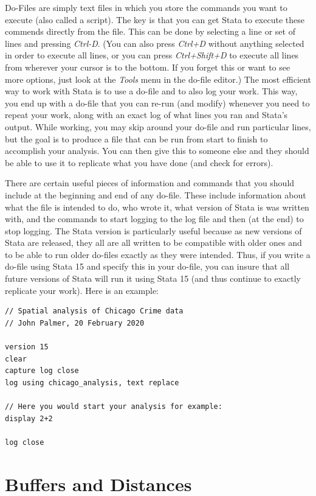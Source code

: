 \documentclass[]{book}
\begin{document}
Do-Files are simply text files in which you store the commands you want to execute (also called a script). The key is that you can get Stata to execute these commends directly from the file. This can be done by selecting a line or set of lines and pressing \emph{Ctrl-D}. (You can also press \emph{Ctrl+D} without anything selected in order to execute all lines, or you can press \emph{Ctrl+Shift+D} to execute all lines from wherever your cursor is to the bottom. If you forget this or want to see more options, just look at the \emph{Tools} menu in the do-file editor.) The most efficient way to work with Stata is to use a do-file and to also log your work. This way, you end up with a do-file that you can re-run (and modify) whenever you need to repeat your work, along with an exact log of what lines you ran and Stata's output. While working, you may skip around your do-file and run particular lines, but the goal is to produce a file that can be run from start to finish to accomplish your analysis. You can then give this to someone else and they should be able to use it to replicate what you have done (and check for errors).

There are certain useful pieces of information and commands that you should include at the beginning and end of any do-file. These include information about what the file is intended to do, who wrote it, what version of Stata is was written with, and the commands to start logging to the log file and then (at the end) to stop logging. The Stata version is particularly useful because as new versions of Stata are released, they all are all written to be compatible with older ones and to be able to run older do-files exactly as they were intended. Thus, if you write a do-file using Stata 15 and specify this in your do-file, you can insure that all future versions of Stata will run it using Stata 15 (and thus continue to exactly replicate your work). Here is an example:

\begin{verbatim}
// Spatial analysis of Chicago Crime data
// John Palmer, 20 February 2020

version 15
clear
capture log close
log using chicago_analysis, text replace

// Here you would start your analysis for example:
display 2+2

log close
\end{verbatim}

\hypertarget{buffers-distances}{%
\chapter{Buffers and Distances}\label{buffers-distances}}
\end{document}
